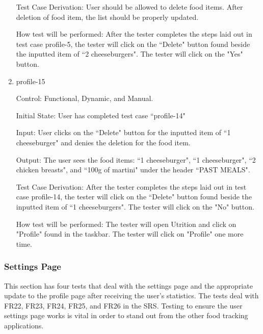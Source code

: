 \documentclass[12pt, titlepage]{article}
\begin{document}
\begin{enumerate}
		Test Case Derivation: User should be allowed to delete food items. After deletion of food item, the list should be properly updated.
		
		How test will be performed: After the tester completes the steps laid out in test case profile-5, the tester will click on the ``Delete" button found beside the inputted item of ``2 cheeseburgers". The tester will click on the "Yes" button.
		
		\item{profile-15\\}
		
		Control: Functional, Dynamic, and Manual.
		
		Initial State: User has completed test case ``profile-14"
		
		Input: User clicks on the ``Delete" button for the inputted item of ``1 cheeseburger" and denies the deletion for the food item.
		
		Output: The user sees the food items: ``1 cheeseburger", ``1 cheeseburger", ``2 chicken breasts", and ``100g of martini" under the header ``PAST MEALS".
		
		Test Case Derivation: After the tester completes the steps laid out in test case profile-14, the tester will click on the ``Delete" button found beside the inputted item of ``1 cheeseburgers". The tester will click on the "No" button.
		
		How test will be performed: The tester will open Utrition and click on "Profile" found in the taskbar. The tester will click on "Profile" one more time.
		
	\end{enumerate}
	
	\subsubsection{Settings Page}
	This section has four tests that deal with the settings page and the appropriate update to the profile page after receiving the user's statistics.  The tests deal with FR22, FR23, FR24, FR25, and FR26 in the SRS. Testing to ensure the user settings page works is vital in order to stand out from the other food tracking applications.
	
\end{document}
